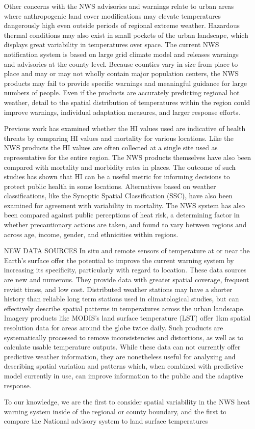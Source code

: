 Other concerns with the NWS advisories and warnings relate to urban areas where anthropogenic land cover modifications may elevate temperatures dangerously high even outside periods of regional extreme weather. Hazardous thermal conditions may also exist in small pockets of the urban landscape, which displays great variability in temperatures over space.  The current NWS notification system is based on large grid climate model and releases warnings and advisories at the county level. Because counties vary in size from place to place and may or may not wholly contain major population centers, the NWS products may fail to provide specific warnings and meaningful guidance for large numbers of people. Even if the products are accurately predicting regional hot weather, detail to the spatial distribution of temperatures within the region could improve warnings, individual adaptation measures, and larger response efforts. 

Previous work has examined whether the HI values used are indicative of health threats by comparing HI values and mortality for various locations. Like the NWS products the HI values are often collected at a single site used as representative for the entire region. The NWS products themselves have also been compared with mortality and morbidity rates in places. The outcome of such studies has shown that HI can be a useful metric for informing decisions to protect public health in some locations. Alternatives based on weather classifications, like the Synoptic Spatial Classification (SSC), have also been examined for agreement with variability in mortality. The NWS system has also been compared against public perceptions of heat risk, a determining factor in whether precautionary actions are taken, and found to vary between regions and across age, income, gender, and ethnicities within regions. 

NEW DATA SOURCES
In situ and remote sensors of temperature at or near the Earth’s surface offer the potential to improve the current warning system by increasing its specificity, particularly with regard to location. These data sources are new and numerous. They provide data with greater spatial coverage, frequent revisit times, and low cost. Distributed weather stations may have a shorter history than reliable long term stations used in climatological studies, but can effectively describe spatial patterns in temperatures across the urban landscape.  Imagery products like MODIS’s land surface temperature (LST) offer 1km spatial resolution data for areas around the globe twice daily. Such products are systematically processed to remove inconsistencies and distortions, as well as to calculate usable temperature outputs. While these data can not currently offer predictive weather information, they are nonetheless useful for analyzing and describing spatial variation and patterns which, when combined with predictive model currently in use, can improve information to the public and the adaptive response. 

To our knowledge, we are the first to consider spatial variability in the NWS heat warning system inside of the regional or county boundary, and the first to compare the National advisory system to land surface temperatures 

